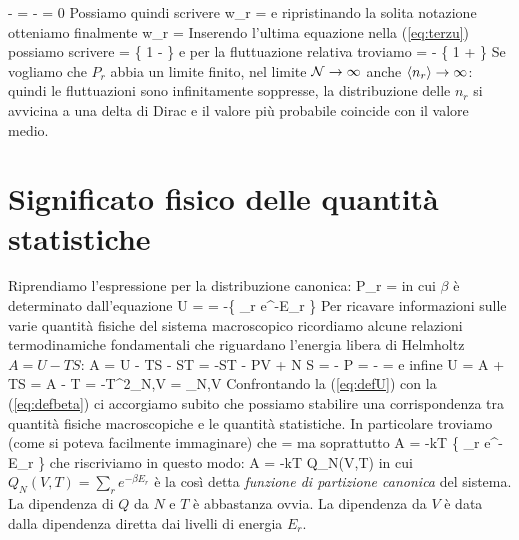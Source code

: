 \be
{} -  = 
 -  = 0
\ee
Possiamo quindi scrivere
\be
w_r =  
\ee
e ripristinando la solita notazione otteniamo finalmente
\be
w_r =  
\ee
Inserendo l'ultima equazione nella (\ref{eq:terzu}) possiamo scrivere
\be
{} = 
\left\{
1 -  
\right\}
\ee
e per la fluttuazione relativa troviamo
\be
{} =  - 
\left\{
1 + 
\right\}
\ee
Se vogliamo che $P_r$ abbia un limite finito, nel limite ${\mathcal N}\to\infty$ anche $\langle n_r\rangle\to\infty$: quindi le fluttuazioni sono infinitamente soppresse, la distribuzione delle $n_r$ si avvicina a una delta di Dirac e il valore più probabile coincide con il valore medio.

\section{Significato fisico delle quantità statistiche}

Riprendiamo l'espressione per la distribuzione canonica:
\be
\label{eq:distcan}
P_r \equiv {} = 
\ee
in cui $\beta$ è determinato dall'equazione
\be
\label{eq:defbeta}
U =  = -\dpar{}{\beta}\ln\left\{ \sum_r e^{-\beta E_r} \right\}
\ee
Per ricavare informazioni sulle varie quantità fisiche del sistema macroscopico ricordiamo alcune relazioni termodinamiche fondamentali che riguardano l'energia libera di Helmholtz $A = U - TS$:
\be
\label{eq:dA}
\de A = \de U - T\de S - S\de T = -S\de T - P\de V + \mu\de N
\ee
\be
\label{eq:maxdA}
S   = - \quad
P   = - \quad
\mu =  
\ee
e infine
\be
\label{eq:defU}
U = A + TS = A - T = -T^2_{N,V}
= _{N,V}
\ee
Confrontando la (\ref{eq:defU}) con la (\ref{eq:defbeta}) ci accorgiamo subito che possiamo stabilire una corrispondenza tra quantità fisiche macroscopiche e le quantità statistiche. In particolare troviamo (come si poteva facilmente immaginare) che
\be
\beta = 
\ee
ma soprattutto
\be
A = -kT \ln\left\{ \sum_r e^{-\beta E_r} \right\}
\ee
che riscriviamo in questo modo:
\be
\label{eq:introQ}
A = -kT \ln Q_N(V,T)
\ee
in cui $Q_N(V,T) = \sum_r e^{-\beta E_r}$ è la così detta {\em funzione di partizione canonica} del sistema. La dipendenza di $Q$ da $N$ e $T$ è abbastanza ovvia. La dipendenza da $V$ è data dalla dipendenza diretta dai livelli di energia $E_r$.

